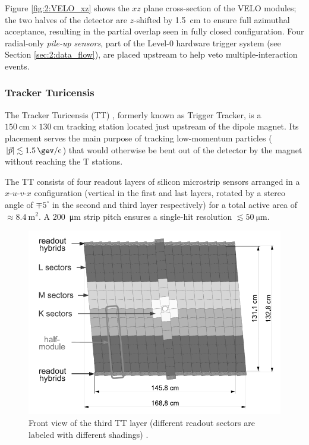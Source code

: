 Figure \ref{fig:2:VELO_xz} shows the $xz$ plane cross-section of the VELO modules; the two halves of the detector are $z$-shifted by \SI{1.5}{\centi\meter} to ensure full azimuthal acceptance, resulting in the partial overlap seen in fully closed configuration.
Four radial-only \textit{pile-up sensors}, part of the Level-0 hardware trigger system (see Section \ref{sec:2:data_flow}), are placed upstream to help veto multiple-interaction events.



\subsubsection{Tracker Turicensis}
The Tracker Turicensis (TT) \cite{Gassner:728548}, formerly known as Trigger Tracker, is a $\SI{150}{\centi\meter} \times \SI{130}{\centi\meter}$ tracking station located just upstream of the dipole magnet.
Its placement serves the main purpose of tracking low-momentum particles ($|\vec{p}| \lesssim \SI{1.5}{\gev\per c}$) that would otherwise be bent out of the detector by the magnet without reaching the T stations.

The TT consists of four readout layers of silicon microstrip sensors arranged in a $x$-$u$-$v$-$x$ configuration (vertical in the first and last layers, rotated by a stereo angle of $\mp 5^\circ$ in the second and third layer respectively) for a total active area of $\approx \SI{8.4}{\meter\squared}$.
A \SI{200}{\micro\meter} strip pitch ensures a single-hit resolution $\lesssim \SI{50}{\micro\meter}$.

\begin{figure}[t]
	\centering
	\includegraphics[width=.6\textwidth]{graphics/02-lhcb/TT_layout.png}
	\caption[Front view of the third TT layer.]{Front view of the third TT layer (different readout sectors are labeled with different shadings) \cite{Alves:1129809}.}
	\label{fig:2:TT}
\end{figure}

